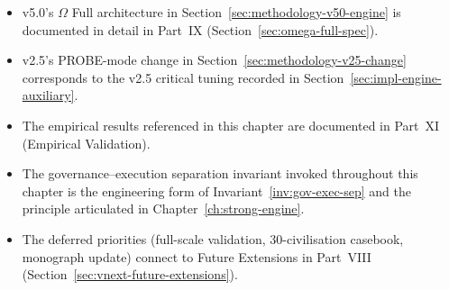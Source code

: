 \begin{itemize}
\item v5.0's $\Omega$ Full architecture in
Section~\ref{sec:methodology-v50-engine} is documented in detail in
Part~IX (Section~\ref{sec:omega-full-spec}).
\item v2.5's PROBE-mode change in
Section~\ref{sec:methodology-v25-change} corresponds to the v2.5
critical tuning recorded in
Section~\ref{sec:impl-engine-auxiliary}.
\item The empirical results referenced in this chapter are
documented in Part~XI (Empirical Validation).
\item The governance--execution separation invariant invoked
throughout this chapter is the engineering form of
Invariant~\ref{inv:gov-exec-sep} and the principle articulated in
Chapter~\ref{ch:strong-engine}.
\item The deferred priorities (full-scale validation, 30-civilisation
casebook, monograph update) connect to Future Extensions in
Part~VIII (Section~\ref{sec:vnext-future-extensions}).
\end{itemize}
